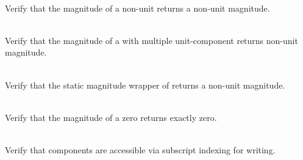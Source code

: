 \begin{DoxyRefList}
\item[{\parbox[t]{\linewidth}{Member \doxylink{group___f_g_m___vec4___magnitude_ga21e4a3ee5db8c292595e4300815d31b6}{Vector4\+DMagnitude\+\_\+\+Non\+Unit\+Vector\+Returns\+Correct\+Magnitude} ()}}]\hfill \\
\label{test__test000110}%
%
Verify that the magnitude of a non-\/unit  returns a non-\/unit magnitude.  
\item[{\parbox[t]{\linewidth}{Member \doxylink{group___f_g_m___vec4___magnitude_ga57e0074f771605ffa75006a789a1bf38}{Vector4\+DMagnitude\+\_\+\+One\+Component\+Vector\+Returns\+Non\+Unit\+Scalar} ()}}]\hfill \\
\label{test__test000109}%
%
Verify that the magnitude of a  with multiple unit-\/component returns non-\/unit magnitude.  
\item[{\parbox[t]{\linewidth}{Member \doxylink{group___f_g_m___vec4___magnitude_ga5bfd2089d9a157b2eec7d5bd8f61f268}{Vector4\+DMagnitude\+\_\+\+Static\+Wrapper\+\_\+\+Non\+Unit\+Vector\+Returns\+Correct\+Magnitude} ()}}]\hfill \\
\label{test__test000112}%
%
Verify that the static magnitude wrapper of  returns a non-\/unit magnitude.  
\item[{\parbox[t]{\linewidth}{Member \doxylink{group___f_g_m___vec4___magnitude_ga8a099e8beb853a0a450ab830bbb338ce}{Vector4\+DMagnitude\+\_\+\+Zero\+Vector\+Returns\+Zero} ()}}]\hfill \\
\label{test__test000108}%
%
Verify that the magnitude of a zero  returns exactly zero.  
\item[{\parbox[t]{\linewidth}{Member \doxylink{group___f_g_m___vec4___mutation_ga0d0bf8d13ce647da62bdda46aa95ed96}{Vector4\+DMutation\+\_\+\+Elements\+Can\+Be\+Mutated\+Using\+Index} ()}}]\hfill \\
\label{test__test000009}%
%
Verify that  components are accessible via subscript indexing for writing.  
\item[{\parbox[t]{\linewidth}{Member \doxylink{group___f_g_m___vec4___mutation_ga5393bc3973ccca0a991374144b92ffb0}{Vector4\+DMutation\+\_\+\+Elements\+Can\+Be\+Mutated\+Using\+RGBA} ()}}]\hfill \\

\end{DoxyRefList}
